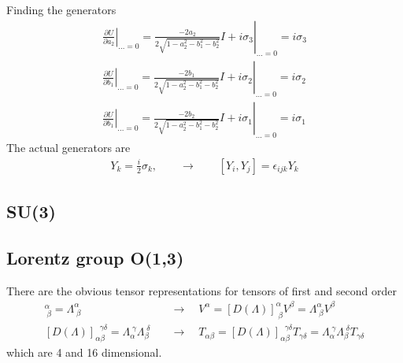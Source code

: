 \documentclass[10pt,a4paper]{book}
\theoremstyle{definition}
\begin{document}
Finding the generators
\begin{align*}
\left.\frac{\partial U}{\partial a_2}\right|_{...=0}=\left.\frac{-2a_2}{2\sqrt{1-a_2^2-b_1^2-b_2^2}}I+i\sigma_3\right|_{...=0}=i\sigma_3\\
\left.\frac{\partial U}{\partial b_1}\right|_{...=0}=\left.\frac{-2b_1}{2\sqrt{1-a_2^2-b_1^2-b_2^2}}I+i\sigma_2\right|_{...=0}=i\sigma_2\\
\left.\frac{\partial U}{\partial b_1}\right|_{...=0}=\left.\frac{-2b_2}{2\sqrt{1-a_2^2-b_1^2-b_2^2}}I+i\sigma_1\right|_{...=0}=i\sigma_1
\end{align*}
The actual generators are
\begin{align*}
Y_k=\frac{i}{2}\sigma_k,\qquad\rightarrow\qquad[Y_i,Y_j]=\epsilon_{ijk}Y_k
\end{align*}

\subsection{SU(3)}

\subsection{Lorentz group O(1,3)}
There are the obvious tensor representations for tensors of first and second order
\begin{align}
    [D(\Lambda)]^\alpha_{\;\beta}=\Lambda^\alpha_{\;\beta}\quad &\rightarrow\quad V^\alpha = [D(\Lambda)]^\alpha_{\;\beta} V^\beta=\Lambda^\alpha_{\;\beta} V^\beta\\
    [D(\Lambda)]_{\alpha\beta}^{\;\;\gamma\delta}=\Lambda_\alpha^{\;\gamma}\Lambda_\beta^{\;\delta}\quad&\rightarrow\quad T_{\alpha\beta} = [D(\Lambda)]_{\alpha\beta}^{\;\;\gamma\delta} T_{\gamma\delta}=\Lambda_\alpha^{\;\gamma}\Lambda_\beta^{\;\delta}T_{\gamma\delta}
\end{align}
which are 4 and 16 dimensional.
\end{document}
